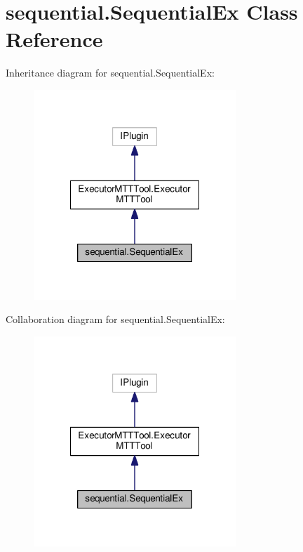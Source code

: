 \hypertarget{classsequential_1_1SequentialEx}{\section{sequential.\-Sequential\-Ex Class Reference}
\label{classsequential_1_1SequentialEx}
}


Inheritance diagram for sequential.\-Sequential\-Ex\-:
\nopagebreak
\begin{figure}[H]
\begin{center}
\leavevmode
\includegraphics[width=216pt]{classsequential_1_1SequentialEx__inherit__graph}
\end{center}
\end{figure}


Collaboration diagram for sequential.\-Sequential\-Ex\-:
\nopagebreak
\begin{figure}[H]
\begin{center}
\leavevmode
\includegraphics[width=216pt]{classsequential_1_1SequentialEx__coll__graph}
\end{center}
\end{figure}
